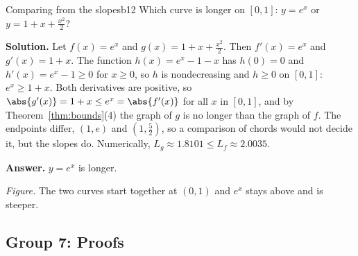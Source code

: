 \documentclass[11pt]{article}
\begin{document}
\begin{exmp}{Comparing from the slopes}{b12}
Which curve is longer on $[0,1]$: $y=e^x$ or $y=1+x+\frac{x^2}2$?

\textbf{Solution.} Let $f(x)=e^x$ and $g(x)=1+x+\frac{x^2}2$. Then $f'(x)=e^x$ and $g'(x)=1+x$. The function $h(x)=e^x-1-x$ has $h(0)=0$ and $h'(x)=e^x-1\ge0$ for $x\ge0$, so $h$ is nondecreasing and $h\ge0$ on $[0,1]$: $e^x\ge1+x$. Both derivatives are positive, so $\abs{g'(x)}=1+x\le e^x=\abs{f'(x)}$ for all $x$ in $[0,1]$, and by Theorem~\ref{thm:bounds}(4) the graph of $g$ is no longer than the graph of $f$. The endpoints differ, $(1,e)$ and $(1,\frac52)$, so a comparison of chords would not decide it, but the slopes do. Numerically, $L_g\approx1.8101\le L_f\approx2.0035$.

\textbf{Answer.} $y=e^x$ is longer.
\begin{center}
\par\small\emph{Figure.} The two curves start together at $(0,1)$ and $e^x$ stays above and is steeper.
\end{center}
\end{exmp}

\subsection*{Group 7: Proofs}
\end{document}
